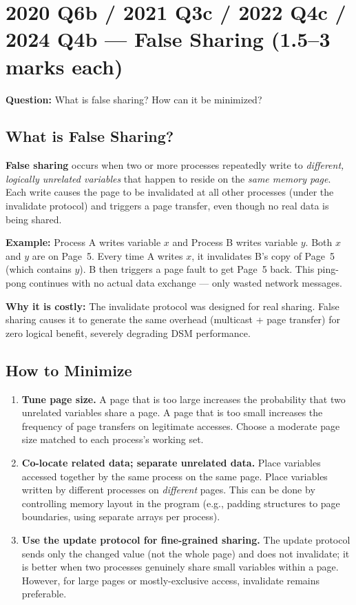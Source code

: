 \documentclass[12pt,a4paper]{article}
\begin{document}
\section{2020 Q6b / 2021 Q3c / 2022 Q4c / 2024 Q4b --- False Sharing (1.5--3 marks each)}

\textbf{Question:} What is false sharing? How can it be minimized?

\subsection*{What is False Sharing?}

\textbf{False sharing} occurs when two or more processes repeatedly write to \emph{different, logically unrelated variables} that happen to reside on the \emph{same memory page}. Each write causes the page to be invalidated at all other processes (under the invalidate protocol) and triggers a page transfer, even though no real data is being shared.

\textbf{Example:} Process A writes variable $x$ and Process B writes variable $y$. Both $x$ and $y$ are on Page~5. Every time A writes $x$, it invalidates B's copy of Page~5 (which contains $y$). B then triggers a page fault to get Page~5 back. This ping-pong continues with no actual data exchange --- only wasted network messages.

\textbf{Why it is costly:} The invalidate protocol was designed for real sharing. False sharing causes it to generate the same overhead (multicast + page transfer) for zero logical benefit, severely degrading DSM performance.

\subsection*{How to Minimize}

\begin{enumerate}
  \item \textbf{Tune page size.} A page that is too large increases the probability that two unrelated variables share a page. A page that is too small increases the frequency of page transfers on legitimate accesses. Choose a moderate page size matched to each process's working set.

  \item \textbf{Co-locate related data; separate unrelated data.} Place variables accessed together by the same process on the same page. Place variables written by different processes on \emph{different} pages. This can be done by controlling memory layout in the program (e.g., padding structures to page boundaries, using separate arrays per process).

  \item \textbf{Use the update protocol for fine-grained sharing.} The update protocol sends only the changed value (not the whole page) and does not invalidate; it is better when two processes genuinely share small variables within a page. However, for large pages or mostly-exclusive access, invalidate remains preferable.
\end{enumerate}
\end{document}
